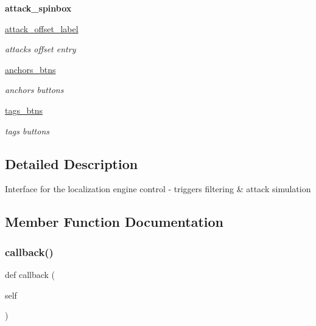 \begin{DoxyCompactItemize}
\mbox{\label{class_menu_1_1_menu_a949decce69b0df45cc6faf9b2efdc51a}} 
{\bfseries attack\+\_\+spinbox}
\item 
\mbox{\label{class_menu_1_1_menu_a4a461f6c5ec2ce0f28c3be0a1cf2d787}} 
\mbox{\hyperlink{class_menu_1_1_menu_a4a461f6c5ec2ce0f28c3be0a1cf2d787}{attack\+\_\+offset\+\_\+label}}
\begin{DoxyCompactList}\small\item\em attacks offset entry \end{DoxyCompactList}\item 
\mbox{\label{class_menu_1_1_menu_aa7f3ef1a3a73616aa12a5307dc9cc554}} 
\mbox{\hyperlink{class_menu_1_1_menu_aa7f3ef1a3a73616aa12a5307dc9cc554}{anchors\+\_\+btns}}
\begin{DoxyCompactList}\small\item\em anchors buttons \end{DoxyCompactList}\item 
\mbox{\label{class_menu_1_1_menu_a9335ed4e67e20e89e460be45f95af9c8}} 
\mbox{\hyperlink{class_menu_1_1_menu_a9335ed4e67e20e89e460be45f95af9c8}{tags\+\_\+btns}}
\begin{DoxyCompactList}\small\item\em tags buttons \end{DoxyCompactList}\end{DoxyCompactItemize}


\subsection{Detailed Description}
\begin{DoxyVerb}Interface for the localization engine control - triggers filtering & attack simulation\end{DoxyVerb}
 

\subsection{Member Function Documentation}
\mbox{\label{class_menu_1_1_menu_ae075907d13c81100442befb9dd9c63c1}} 
\subsubsection{\texorpdfstring{callback()}{callback()}}
{\footnotesize\ttfamily def callback (\begin{DoxyParamCaption}\item[{}]{self }\end{DoxyParamCaption})}

